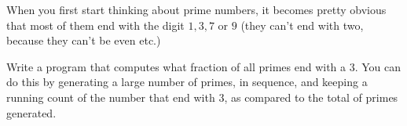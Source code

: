 
When you first start thinking about prime numbers, it becomes pretty
obvious that most of them end with the digit $1,3,7$ or $9$ (they
can't end with two, because they can't be even etc.)
\begin{exercise}
Write a program that computes what fraction of all primes end with a $3$.
You can do this by generating a large number of primes, in sequence, and
keeping a running count of the number that end with $3$, as compared to
the total of primes generated.
\end{exercise}
